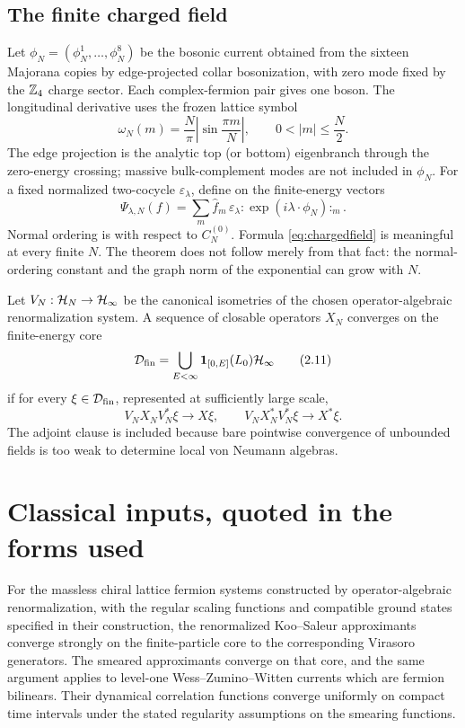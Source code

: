\subsection{The finite charged field}

Let $\phi_N=(\phi_N^1,\ldots,\phi_N^8)$ be the bosonic current obtained
from the sixteen Majorana copies by edge-projected collar bosonization,
with zero mode fixed by the $\mathbb Z_4$ charge sector.  Each complex-fermion
pair gives one boson.  The longitudinal derivative uses the frozen
lattice symbol
\[
 \omega_N(m)=\frac{N}{\pi}\left|\sin\frac{\pi m}{N}\right|,
 \qquad 0<|m|\le\frac N2.
\tag{2.9}\label{eq:latticesymbol}
\]
The edge projection is the analytic top (or bottom) eigenbranch through
the zero-energy crossing; massive bulk-complement modes are not included
in $\phi_N$.  For a fixed normalized
two-cocycle $\varepsilon_\lambda$, define on the finite-energy vectors
\[
 \Psi_{\lambda,N}(f)
 =\sum_{m}\widehat f_m\,
   \varepsilon_\lambda
   :\!\exp(i\lambda\cdot\phi_N)\!:_m .
 \tag{2.10}\label{eq:chargedfield}
\]
Normal ordering is with respect to $C_N^{(0)}$.  Formula
\eqref{eq:chargedfield} is meaningful at every finite $N$.  The theorem
does not follow merely from that fact: the normal-ordering constant and
the graph norm of the exponential can grow with $N$.

\begin{definition}
Let $V_N:\mathcal H_N\to\mathcal H_\infty$ be the canonical isometries of the chosen
operator-algebraic renormalization system.  A sequence of closable
operators $X_N$ converges on the finite-energy core
\[
 \mathcal D_{\mathrm{fin}}=\bigcup_{E<\infty}\mathbf 1_{[0,E]}(L_0)\mathcal H_\infty
 \tag{2.11}\label{eq:core}
\]
if for every $\xi\in\mathcal D_{\mathrm{fin}}$, represented at sufficiently large scale,
\[
 V_NX_NV_N^*\xi\longrightarrow X\xi,\qquad
 V_NX_N^*V_N^*\xi\longrightarrow X^*\xi.
 \tag{2.12}\label{eq:graphconv}
\]
The adjoint clause is included because bare pointwise convergence of
unbounded fields is too weak to determine local von Neumann algebras.
\end{definition}

\section{Classical inputs, quoted in the forms used}
\label{sec:classical}

\begin{theorem}\label{thm:OS}
For the massless chiral lattice fermion systems constructed by
operator-algebraic renormalization, with the regular scaling functions
and compatible ground states specified in their construction, the
renormalized Koo--Saleur approximants converge strongly on the
finite-particle core to the corresponding Virasoro generators.
The smeared approximants converge on that core, and the same argument
applies to level-one Wess--Zumino--Witten currents which are fermion
bilinears.  Their dynamical correlation functions converge uniformly on
compact time intervals under the stated regularity assumptions on the
smearing functions.
\end{theorem}

